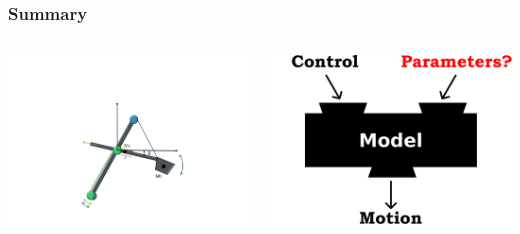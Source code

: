 \documentclass{beamer}
\begin{document}
\begin{frame}[c]
	\frametitle{Summary}

	\begin{columns}
			\includegraphics[trim=30cm 5cm 30cm 23cm, clip=true, width=\linewidth]{img/Excavator_results}
		
			\includegraphics[width=\linewidth]{img/Model_4}
	\end{columns}
\end{frame}
\end{document}
